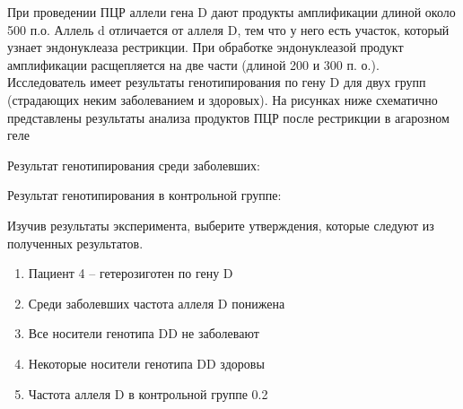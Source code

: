 
При
проведении ПЦР аллели гена D дают
продукты амплификации длиной около 500 п.о. Аллель d отличается от аллеля D,
тем что у него есть участок, который узнает эндонуклеаза рестрикции. При
обработке эндонуклеазой продукт амплификации расщепляется на две части (длиной
200 и 300 п. о.). Исследователь имеет результаты генотипирования по гену D для двух групп (страдающих неким
заболеванием и здоровых). На рисунках ниже схематично представлены результаты
анализа продуктов ПЦР после рестрикции в агарозном геле 

Результат генотипирования среди заболевших:


Результат генотипирования в контрольной
группе:


Изучив результаты эксперимента, выберите
утверждения, которые следуют из полученных результатов.

\begin{enumerate}
    \item Пациент 4 – гетерозиготен по гену D
    \item Среди заболевших частота аллеля D понижена
    \item Все носители генотипа DD не заболевают
    \item Некоторые носители генотипа DD здоровы
    \item Частота аллеля D в контрольной группе 0.2
\end{enumerate}

\explanationSection

